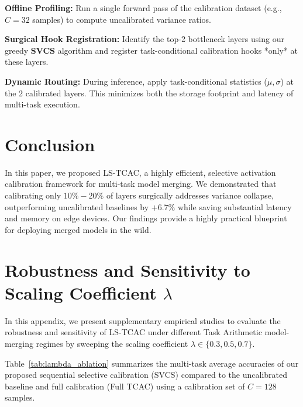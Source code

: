 \documentclass{article}
\theoremstyle{plain}
\theoremstyle{definition}
\theoremstyle{remark}
\begin{document}
\textbf{Offline Profiling:} Run a single forward pass of the calibration dataset (e.g., $C=32$ samples) to compute uncalibrated variance ratios.

\textbf{Surgical Hook Registration:} Identify the top-2 bottleneck layers using our greedy \textbf{SVCS} algorithm and register task-conditional calibration hooks *only* at these layers.

\textbf{Dynamic Routing:} During inference, apply task-conditional statistics ($\mu, \sigma$) at the 2 calibrated layers. This minimizes both the storage footprint and latency of multi-task execution.

\section{Conclusion}
\label{sec:conclusion}
In this paper, we proposed LS-TCAC, a highly efficient, selective activation calibration framework for multi-task model merging. We demonstrated that calibrating only $10\%-20\%$ of layers surgically addresses variance collapse, outperforming uncalibrated baselines by $+6.7\%$ while saving substantial latency and memory on edge devices. Our findings provide a highly practical blueprint for deploying merged models in the wild.

\clearpage
\nocite{*}



\clearpage
\appendix
\onecolumn
\section{Robustness and Sensitivity to Scaling Coefficient $\lambda$}
In this appendix, we present supplementary empirical studies to evaluate the robustness and sensitivity of LS-TCAC under different Task Arithmetic model-merging regimes by sweeping the scaling coefficient $\lambda \in \{0.3, 0.5, 0.7\}$.

Table~\ref{tab:lambda_ablation} summarizes the multi-task average accuracies of our proposed sequential selective calibration (SVCS) compared to the uncalibrated baseline and full calibration (Full TCAC) using a calibration set of $C=128$ samples.
\end{document}
